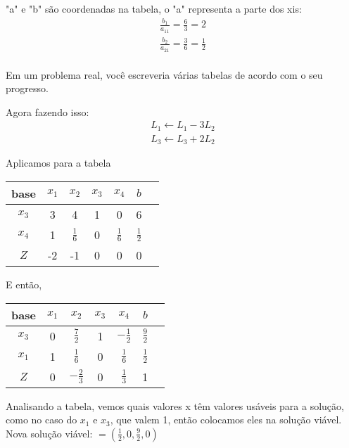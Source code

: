 \documentclass{article}
\begin{document}
"a" e "b" são coordenadas na tabela, o "a" representa a parte dos xis:
\begin{align*}
    \boxed{\frac{b_1}{a_11} = \frac{6}{3} = 2} \\
    \boxed{\frac{b_2}{a_21} = \frac{3}{6} = \frac{1}{2}} \\
\end{align*}

Em um problema real, você escreveria várias tabelas de acordo com o seu progresso.

Agora fazendo isso:
\begin{align*}
    L_1 \leftarrow L_1 - 3L_2 \\
    L_3 \leftarrow L_3 + 2L_2
\end{align*}

Aplicamos para a tabela
\begin{table}[h!]
    \centering
    \begin{tabular}{ c | c c c c | c c}
       base  & $x_1$ & $x_2$ & $x_3$ & $x_4$ & $b$ \\
       \hline
        $x_3$ & 3 & 4 & 1 & 0 & 6 \\
         $x_4$ & 1 & $\frac{1}{6}$ & 0 & $\frac{1}{6}$ & $\frac{1}{2}$ \\
         \hline
        $Z$ & -2 & -1 & 0 & 0 & 0 \\
    \end{tabular}
\end{table}

\clearpage

E então,
\begin{table}[h!]
    \centering
    \begin{tabular}{ c | c c c c | c c}
       base  & $x_1$ & $x_2$ & $x_3$ & $x_4$ & $b$ \\
       \hline
        $x_3$ & 0 & $\frac{7}{2}$ & 1 & $-\frac{1}{2}$ & $\frac{9}{2}$ \\
         $x_1$ & 1 & $\frac{1}{6}$ & 0 & $\frac{1}{6}$ & $\frac{1}{2}$ \\
        \hline
        $Z$ & 0 & $-\frac{2}{3}$ & 0 & $\frac{1}{3}$ & 1 \\
    \end{tabular}
\end{table}

Analisando a tabela, vemos quais valores x têm valores usáveis para a solução, como no caso do $x_1$ e $x_3$, que valem 1, então colocamos eles na solução viável.
Nova solução viável: $= (\frac{1}{2}, 0, \frac{9}{2}, 0)$
\end{document}
